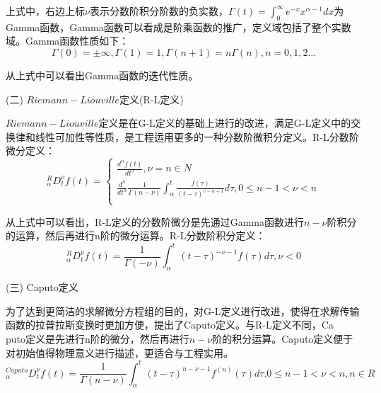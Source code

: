 上式中，右边上标$\nu$表示分数阶积分阶数的负实数，$\Gamma \left( t \right)=\int_{0}^{\infty }{{{e}^{-x}}{{x}^{\alpha -1}}dx}$为\\Gamma函数，Gamma函数可以看成是阶乘函数的推广，定义域包括了整个实数域。Gamma函数性质如下：
\begin{equation}
\Gamma \left( 0 \right)=\pm \infty ,\Gamma \left( 1 \right)=1,\Gamma \left( n+1 \right)=n\Gamma \left( n \right),n=0,1,2\ldots 
\end{equation}

从上式中可以看出Gamma函数的迭代性质。

(二) $Riemann-Liouville$定义(R-L定义)

$Riemann-Liouville$定义是在G-L定义的基础上进行的改进，满足G-L定义中的交换律和线性可加性等性质，是工程运用更多的一种分数阶微积分定义。R-L分数阶微分定义：
\begin{equation}
{}_{\alpha }^{R}D_{t}^{\nu }f(t)=\left\{ \begin{matrix}
   \frac{{{d}^{n}}f\left( t \right)}{d{{t}^{n}}},\nu =n\in N  \\
   \frac{{{d}^{n}}}{d{{t}^{n}}}\frac{1}{\Gamma \left( n-\nu  \right)}\int_{\alpha }^{t}{\frac{f\left( \tau  \right)}{{{\left( t-\tau  \right)}^{\upsilon -n+1}}}d\tau ,0\le n-1<\nu <n}  \\
\end{matrix} \right.
\end{equation}

从上式中可以看出，R-L定义的分数阶微分是先通过Gamma函数进行$n-\nu $阶积分的运算，然后再进行n阶的微分运算。R-L分数阶积分定义：
\begin{equation}
{}_{\alpha }^{R}D_{t}^{\nu }f(t)=\frac{1}{\Gamma \left( -\nu  \right)}\int_{\alpha }^{t}{{{\left( t-\tau  \right)}^{-\nu -1}}f\left( \tau  \right)}d\tau ,\nu <0
\end{equation}

(三)	Caputo定义

为了达到更简洁的求解微分方程组的目的，对G-L定义进行改进，使得在求解传输函数的拉普拉斯变换时更加方便，提出了Caputo定义。与R-L定义不同，Ca\\puto定义是先进行n阶的微分，然后再进行$n-\nu $阶的积分运算。Caputo定义便于对初始值得物理意义进行描述，更适合与工程实用。
\begin{equation}
{}_{\alpha }^{Caputo}D_{t}^{\nu }f(t)=\frac{1}{\Gamma \left( n-\nu  \right)}\int_{\alpha }^{t}{{{\left( t-\tau  \right)}^{n-\nu -1}}{{f}^{\left( n \right)}}\left( \tau  \right)}d\tau .0\le n-1<\nu <n,n\in R
\end{equation}

